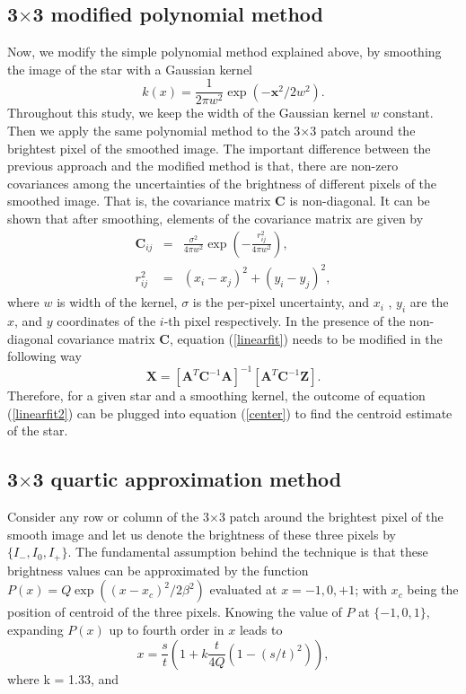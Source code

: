 \documentclass[12pt, preprint]{aastex}
\newcommand{\beq}{\begin{equation}}
\newcommand{\eeq}{\end{equation}}
\begin{document}
\subsection{3$\times$3 modified polynomial method}
Now, we modify the simple polynomial method explained above,
by smoothing the image of the star with a Gaussian kernel
\beq
k(x) = \frac{1}{2\pi w^2}\exp(-\mathbf{x}^{2}/2w^{2}).
\eeq
Throughout this study, we keep the width of the Gaussian kernel $w$ constant.
Then we apply the same polynomial method to the 3$\times$3 patch around the brightest
pixel of the smoothed image. The important difference between the previous
approach and the modified method is that, there are non-zero covariances
among the uncertainties of the brightness of different pixels of the
smoothed image. That is, the covariance matrix $\mathbf{C}$ is non-diagonal.
It can be shown that after smoothing, elements of the covariance matrix are given by
\begin{eqnarray}
\mathbf{C}_{ij} &=& \frac{\sigma^{2}}{4\pi w^{2}} \exp(-\frac{r_{ij}^{2}}{4\pi w^{2}}),\\
r_{ij}^{2} &=& (x_{i} - x_{j})^{2} + (y_{i} - y_{j})^{2},
\label{nondiagonal}
\end{eqnarray}
where $w$ is width of the kernel, $\sigma$ is the per-pixel uncertainty, and $x_{i}$
, $y_{i}$ are the $x$, and $y$ coordinates of the $i$-th pixel
respectively. In the presence of the non-diagonal covariance matrix
$\mathbf{C}$, equation (\ref{linearfit}) needs to be modified in the following way
\beq
\mathbf{X} = [\mathbf{A}^{T}\mathbf{C}^{-1}\mathbf{A}]^{-1}[\mathbf{A}^{T}\mathbf{C}^{-1}\mathbf{Z}].
\label{linearfit2}
\eeq
Therefore, for a given star and a smoothing kernel,
the outcome of equation (\ref{linearfit2}) can be
plugged into equation (\ref{center}) to find the centroid estimate
of the star.
\subsection{3$\times$3 quartic approximation method}
Consider any row or column of the 3$\times$3 patch around
the brightest pixel of the smooth image and let us denote
the brightness of these three pixels by $\{I_{-},I_{0},I_{+}\}$.
The fundamental assumption behind the technique is that these
brightness values can be approximated
by the function $P(x) = Q\exp((x-x_{c})^{2}/2\beta^{2})$
evaluated at $x=-1,0,+1$; with $x_{c}$ being the position of centroid
of the three pixels. Knowing the value of $P$ at $\{-1,0,1\}$,
expanding $P(x)$ up to fourth order in $x$ leads to
\beq
x = \frac{s}{t}(1+k\frac{t}{4Q}(1-(s/t)^{2})),
\eeq
where k = 1.33, and
\end{document}
